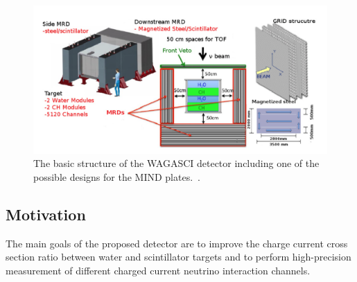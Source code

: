\begin{figure}[h!]
\centering
\includegraphics[width=\textwidth]{figures/WAGASCI.png}
\caption{The basic structure of the WAGASCI detector including one of the possible designs for the MIND plates.~\cite{30WAGASCI}.}
\label{fig:WAGASCI}
\end{figure}

\subsection{Motivation}
The main goals of the proposed detector are to improve the charge current cross section ratio between water and scintillator targets and to perform high-precision measurement of different charged current neutrino interaction channels.

\fi
